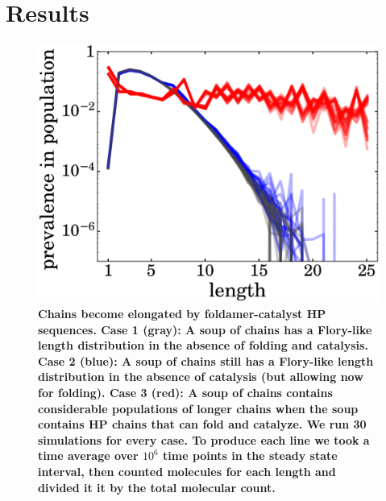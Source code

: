 \documentclass[twocolumn,letterpaper]{revtex4-1}
\begin{document}
\section*{Results}
\begin{figure}[ht!]
  \centering
  \includegraphics[width=\columnwidth]{pictures/all-three-distrs.eps}
  \caption{\footnotesize{\bf{Chains become elongated by foldamer-catalyst HP sequences.}  
\textbf{Case 1 (gray):} A soup of chains has a Flory-like length distribution in the absence of 
folding and catalysis.  \textbf{Case 2 (blue):} A soup of chains still has a Flory-like length 
distribution in the absence of catalysis (but allowing now for folding).  \textbf{Case 3 (red):} A 
soup of chains contains considerable populations of longer chains when the soup contains HP chains 
that can fold and catalyze.  We run 30 simulations for every case. To produce each line we took a 
time average over $10^6$ time points in the steady state interval, then counted molecules for each 
length and divided it it by the total molecular count.}}
  \label{fig:sim.flory-fold}
\end{figure}
\end{document}
